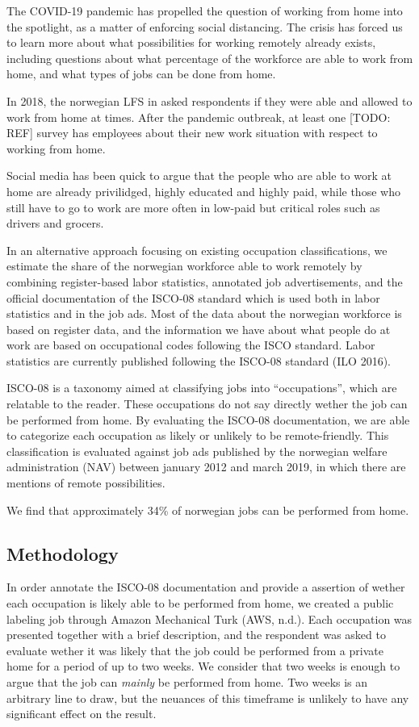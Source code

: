 \documentclass[11pt,]{article}
\begin{document}
The COVID-19 pandemic has propelled the question of working from home
into the spotlight, as a matter of enforcing social distancing. The
crisis has forced us to learn more about what possibilities for working
remotely already exists, including questions about what percentage of
the workforce are able to work from home, and what types of jobs can be
done from home.

In 2018, the norwegian LFS in asked respondents if they were able and
allowed to work from home at times. After the pandemic outbreak, at
least one {[}TODO: REF{]} survey has employees about their new work
situation with respect to working from home.

Social media has been quick to argue that the people who are able to
work at home are already privilidged, highly educated and highly paid,
while those who still have to go to work are more often in low-paid but
critical roles such as drivers and grocers.

In an alternative approach focusing on existing occupation
classifications, we estimate the share of the norwegian workforce able
to work remotely by combining register-based labor statistics, annotated
job advertisements, and the official documentation of the ISCO-08
standard which is used both in labor statistics and in the job ads. Most
of the data about the norwegian workforce is based on register data, and
the information we have about what people do at work are based on
occupational codes following the ISCO standard. Labor statistics are
currently published following the ISCO-08 standard (ILO 2016).

ISCO-08 is a taxonomy aimed at classifying jobs into ``occupations'',
which are relatable to the reader. These occupations do not say directly
wether the job can be performed from home. By evaluating the ISCO-08
documentation, we are able to categorize each occupation as likely or
unlikely to be remote-friendly. This classification is evaluated against
job ads published by the norwegian welfare administration (NAV) between
january 2012 and march 2019, in which there are mentions of remote
possibilities.

We find that approximately 34\% of norwegian jobs can be performed from
home.

\hypertarget{methodology}{%
\subsection{Methodology}\label{methodology}}

In order annotate the ISCO-08 documentation and provide a assertion of
wether each occupation is likely able to be performed from home, we
created a public labeling job through Amazon Mechanical Turk (AWS,
n.d.). Each occupation was presented together with a brief description,
and the respondent was asked to evaluate wether it was likely that the
job could be performed from a private home for a period of up to two
weeks. We consider that two weeks is enough to argue that the job can
\emph{mainly} be performed from home. Two weeks is an arbitrary line to
draw, but the neuances of this timeframe is unlikely to have any
significant effect on the result.
\end{document}
